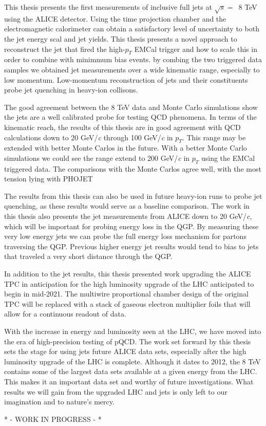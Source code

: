 This thesis presents the first measurements of inclusive full jets at $\sqrt{s} = \,$ 8 TeV using the ALICE detector.  Using the time projection chamber and the electromagnetic calorimeter can obtain a satisfactory level of uncertainty to both the jet energy scal and jet yields.  This thesis presents a novel approach to reconstruct the jet that fired the high-$p_{T}$ EMCal trigger and how to scale this in order to combine with minimmum bias events.  by combing the two triggered data samples we obtained jet measurements over a wide kinematic range, especially to low momentum.  Low-momentum reconstruction of jets and their constituents probe jet quenching in heavy-ion collisons.

The good agreement between the 8 TeV data and Monte Carlo simulations show the jets are a well calibrated probe for testing QCD phenomena.  In terms of the kinematic reach, the results of this thesis are in good agreement with QCD calculations down to 20 GeV/\textit{c} through 100 GeV/\textit{c} in $p_{T}$.  This range may be extended with better Monte Carlos in the future.  With a better Monte Carlo simulations we could see the range extend to 200 GeV/\textit{c} in $p_{T}$ using the EMCal triggered data.  The comparisons with the Monte Carlos agree well, with the most tension lying with PHOJET

The results from this thesis can also be used in future heavy-ion runs to probe jet quenching, as these results would serve as a baseline comparison.  The work in this thesis also presents the jet measurements from ALICE down to 20 GeV/\textit{c}, which will be important for probing energy loss in the QGP.  By measuring these very low energy jets we can probe the full energy loss mechanism for partons traversing the QGP.  Previous higher energy jet results would tend to bias to jets that traveled a very short distance through the QGP.

In addition to the jet results, this thesis presented work upgrading the ALICE TPC in anticipation for the high luminosity upgrade of the LHC anticipated to begin in mid-2021.  The multiwire proportional chamber design of the original TPC will be replaced with a stack of gaseous electron multiplier foils that will allow for a continuous readout of data.

With the increase in energy and luminosity seen at the LHC, we have moved into the era of high-precision testing of pQCD.  The work set forward by this thesis sets the stage for using jets future ALICE data sets, especially after the high luminosity upgrade of the LHC is complete.  Although it dates to 2012, the 8 TeV contains some of the largest data sets available at a given energy from the LHC.  This makes it an important data set and worthy of future investigations.  What results we will gain from the upgraded LHC and jets is only left to our imagination and to nature's mercy.

* - WORK IN PROGRESS - *